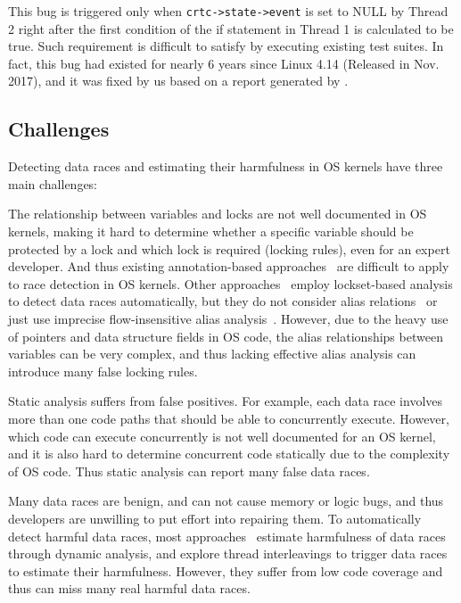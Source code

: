 This bug is triggered only when {\tt crtc->state->event} is set to NULL by 
Thread 2 right after the first condition of the if statement in Thread 1 is 
calculated to be true. Such requirement is difficult to satisfy by executing 
existing test suites. In fact, this bug had existed for nearly 6 years since 
Linux 4.14 (Released in Nov. 2017), and it was fixed by us based on a report 
generated by \sys. 
 
\subsection{Challenges}
\label{subsec_challenges}
Detecting data races and estimating their harmfulness in OS kernels have three 
main challenges:

 The relationship between variables and locks 
are not well documented in OS kernels, making it hard to determine whether a 
specific variable should be protected by a lock and which lock is 
required (locking rules), even for an expert developer. And thus existing 
annotation-based approaches~\cite{Boyapati:OOPSLA02, Anderson:PLDI08, 
Anderson:PLDI09, Zhou:MICRO19, Flanagan:PASTE01, Flanagan:PLDI00, 
Sadowski:PLATEAU14, ClangThreadSafety, Blackshear:OOPSLA18} are difficult to 
apply to race detection in OS kernels. Other approaches~\cite{Choi:PLDI02, 
Engler:SOSP03, Voung:FSE07, Pratikakis:PLDI06, Naik:PLDI06} employ 
lockset-based analysis to detect data races automatically, but they do not 
consider alias relations~\cite{Voung:FSE07, Engler:SOSP03} or just use 
imprecise flow-insensitive alias analysis~\cite{Choi:PLDI02, 	
Pratikakis:PLDI06, Naik:PLDI06}. However, due to the heavy use of pointers and 
data structure fields in OS code, the alias relationships between variables can 
be very complex, and thus lacking effective alias analysis can introduce many 
false locking rules.

 Static analysis suffers from false 
positives. For example, each data race involves more than one code paths that 
should be able to concurrently execute. However, which code can execute 
concurrently is not well documented for an OS kernel, and it is also hard to 
determine concurrent code statically due to the complexity of OS code. Thus 
static analysis can report many false data races.

 Many data races are benign, and 
can not cause memory or logic bugs, and thus developers are unwilling to put 
effort into repairing them. To automatically detect harmful data races, most 
approaches~\cite{Narayanasamy:PLDI07, Sen:PLDI08, Kasikci:SOSP13, 
Kasikci:ASPLOS12} estimate harmfulness of data races through dynamic analysis, 
and explore thread interleavings to trigger data races to estimate their 
harmfulness. However, they suffer from low code coverage and thus can miss many 
real harmful data races.



